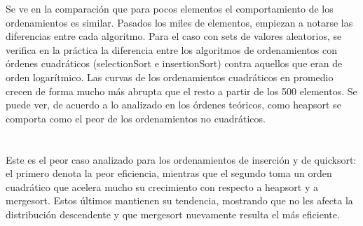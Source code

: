 \documentclass[article,a4paper]{article}
\begin{document}
Se ve en la comparación que para pocos elementos el comportamiento de los ordenamientos es similar. Pasados los miles de elementos, empiezan a notarse las diferencias entre cada algoritmo. Para el caso con sets de valores aleatorios, se verifica en la práctica la diferencia entre los algoritmos de ordenamientos con órdenes cuadráticos (selectionSort e insertionSort) contra aquellos que eran de orden logarítmico. Las curvas de los ordenamientos cuadráticos en promedio crecen de forma mucho más abrupta que el resto a partir de los 500 elementos. Se puede ver, de acuerdo a lo analizado en los órdenes teóricos, como heapsort se comporta como el peor de los ordenamientos no cuadráticos.\\

\\ \\

Este es el peor caso analizado para los ordenamientos de inserción y de quicksort: el primero denota la peor eficiencia, mientras que el segundo toma un orden cuadrático que acelera mucho su crecimiento con respecto a heapsort y a mergesort. Estos últimos mantienen su tendencia, mostrando que no les afecta la distribución descendente y que mergesort nuevamente resulta el más eficiente.\\

\\ \\
\end{document}
